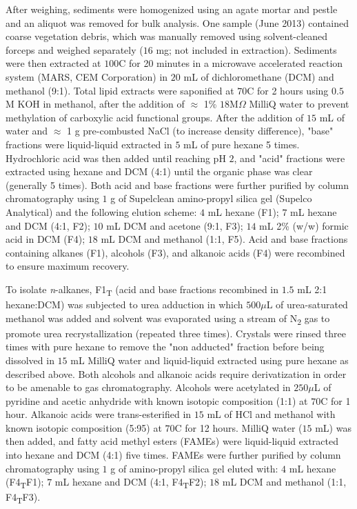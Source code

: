 After weighing, sediments were homogenized using an agate mortar and pestle and an aliquot was removed for bulk analysis. One sample (June 2013) contained coarse vegetation debris, which was manually removed using solvent-cleaned forceps and weighed separately ($16$ mg; not included in extraction). Sediments were then extracted at $100$\textdegree C for 20 minutes in a microwave accelerated reaction system (MARS, CEM Corporation) in $20$ mL of dichloromethane (DCM) and methanol (9:1). Total lipid extracts were saponified at $70$\textdegree C for 2 hours using $0.5$ M KOH in methanol, after the addition of $\approx$ 1\% $18$M$\Omega$ MilliQ water to prevent methylation of carboxylic acid functional groups. After the addition of $15$ mL of water and $\approx$ 1 g pre-combusted NaCl (to increase density difference), "base" fractions were liquid-liquid extracted in $5$ mL of pure hexane 5 times. Hydrochloric acid was then added until reaching pH $2$, and "acid" fractions were extracted using hexane and DCM (4:1) until the organic phase was clear (generally 5 times). Both acid and base fractions were further purified by column chromatography using $1$ g of Supelclean amino-propyl silica gel (Supelco Analytical) and the following elution scheme: $4$ mL hexane (F1); $7$ mL hexane and DCM (4:1, F2); $10$ mL DCM and acetone (9:1, F3); $14$ mL 2\% (w/w) formic acid in DCM (F4); $18$ mL DCM and methanol (1:1, F5). Acid and base fractions containing alkanes (F1), alcohols (F3), and alkanoic acids (F4) were recombined to ensure maximum recovery.

To isolate \textit{n}-alkanes, F1\textsubscript{T} (acid and base fractions recombined in $1.5$ mL 2:1 hexane:DCM) was subjected to urea adduction in which $500\mu$L of urea-saturated methanol was added and solvent was evaporated using a stream of N\textsubscript{2} gas to promote urea recrystallization (repeated three times). Crystals were rinsed three times with pure hexane to remove the "non adducted" fraction before being dissolved in $15$ mL MilliQ water and liquid-liquid extracted using pure hexane as described above. Both alcohols and alkanoic acids require derivatization in order to be amenable to gas chromatography. Alcohols were acetylated in $250\mu$L of pyridine and acetic anhydride with known isotopic composition (1:1) at $70$\textdegree C for 1 hour. Alkanoic acids were trans-esterified in $15$ mL of HCl and methanol with known isotopic composition (5:95) at $70$\textdegree C for 12 hours. MilliQ water ($15$ mL) was then added, and fatty acid methyl esters (FAMEs) were liquid-liquid extracted into hexane and DCM (4:1) five times. FAMEs were further purified by column chromatography using $1$ g of amino-propyl silica gel eluted with: $4$ mL hexane (F4\textsubscript{T}F1); $7$ mL hexane and DCM (4:1, F4\textsubscript{T}F2); $18$ mL DCM and methanol (1:1, F4\textsubscript{T}F3).

